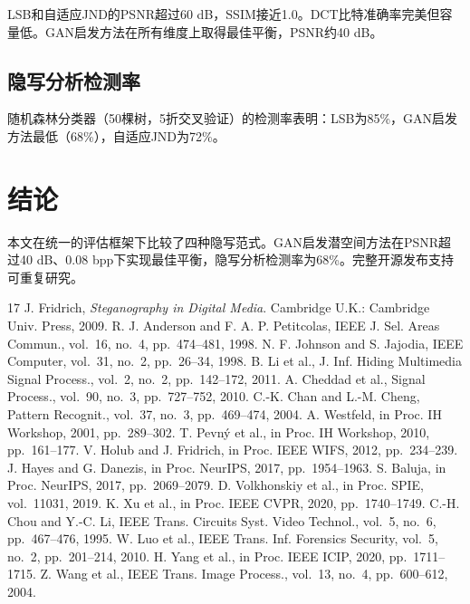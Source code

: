 \documentclass[conference]{IEEEtran}
\begin{document}
LSB和自适应JND的PSNR超过60 dB，SSIM接近1.0。DCT比特准确率完美但容量低。GAN启发方法在所有维度上取得最佳平衡，PSNR约40 dB。

\subsection{隐写分析检测率}

随机森林分类器（50棵树，5折交叉验证）的检测率表明：LSB为85\%，GAN启发方法最低（68\%），自适应JND为72\%。

\section{结论}
\label{sec:conclusion}

本文在统一的评估框架下比较了四种隐写范式。GAN启发潜空间方法在PSNR超过40 dB、0.08 bpp下实现最佳平衡，隐写分析检测率为68\%。完整开源发布支持可重复研究。

\begin{thebibliography}{17}
 J. Fridrich, \textit{Steganography in Digital Media}. Cambridge U.K.: Cambridge Univ. Press, 2009.
 R. J. Anderson and F. A. P. Petitcolas, IEEE J. Sel. Areas Commun., vol.~16, no.~4, pp.~474--481, 1998.
 N. F. Johnson and S. Jajodia, IEEE Computer, vol.~31, no.~2, pp.~26--34, 1998.
 B. Li et al., J. Inf. Hiding Multimedia Signal Process., vol.~2, no.~2, pp.~142--172, 2011.
 A. Cheddad et al., Signal Process., vol.~90, no.~3, pp.~727--752, 2010.
 C.-K. Chan and L.-M. Cheng, Pattern Recognit., vol.~37, no.~3, pp.~469--474, 2004.
 A. Westfeld, in Proc. IH Workshop, 2001, pp.~289--302.
 T. Pevn\'y et al., in Proc. IH Workshop, 2010, pp.~161--177.
 V. Holub and J. Fridrich, in Proc. IEEE WIFS, 2012, pp.~234--239.
 J. Hayes and G. Danezis, in Proc. NeurIPS, 2017, pp.~1954--1963.
 S. Baluja, in Proc. NeurIPS, 2017, pp.~2069--2079.
 D. Volkhonskiy et al., in Proc. SPIE, vol.~11031, 2019.
 K. Xu et al., in Proc. IEEE CVPR, 2020, pp.~1740--1749.
 C.-H. Chou and Y.-C. Li, IEEE Trans. Circuits Syst. Video Technol., vol.~5, no.~6, pp.~467--476, 1995.
 W. Luo et al., IEEE Trans. Inf. Forensics Security, vol.~5, no.~2, pp.~201--214, 2010.
 H. Yang et al., in Proc. IEEE ICIP, 2020, pp.~1711--1715.
 Z. Wang et al., IEEE Trans. Image Process., vol.~13, no.~4, pp.~600--612, 2004.
\end{thebibliography}
\end{document}
